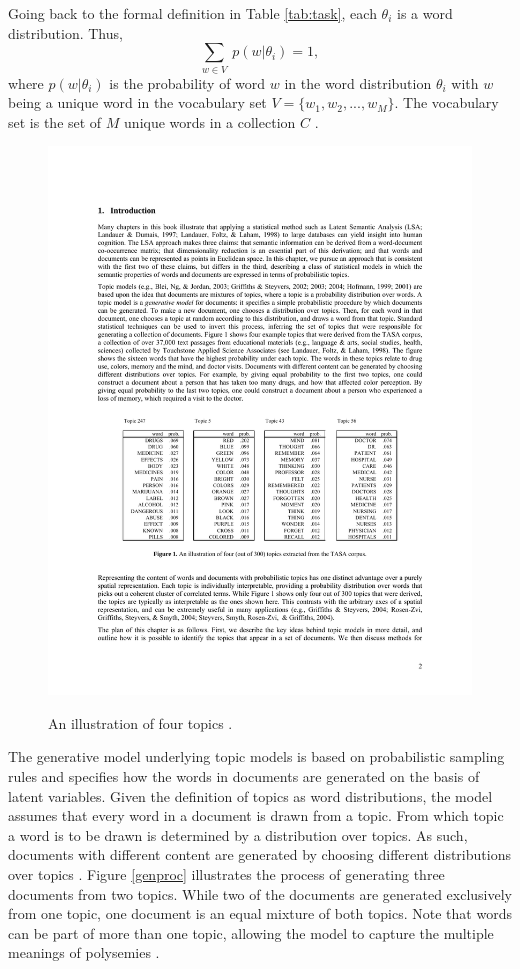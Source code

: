 \documentclass[11pt,a4paper,english,oneside]{book}
\numberwithin{equation}{chapter}
\begin{document}
Going back to the formal definition in Table \ref{tab:task}, each $\theta_i$ is a word distribution. Thus,
$$
\underset{w \in V}{\sum} \ p(w | \theta_i) = 1,
$$
where $p(w | \theta_i)$ is the probability of word $w$ in the word distribution $\theta_i$ with $w$ being a unique word in the vocabulary set $V = \{w_1, w_2, ..., w_M\}$. The vocabulary set is the set of $M$ unique words in a collection $C$ \cite[p.~338]{Zhai.2016}.

\begin{figure}
	\caption{An illustration of four topics \cite[p. 2]{Steyvers(2007)}.}
	\centering
	\includegraphics[scale=1]{Images/SteyversGriffithsTopics.pdf}
	\label{fourtopics}
\end{figure}

The generative model underlying topic models is based on probabilistic sampling rules and specifies how the words in documents are generated on the basis of latent variables. Given the definition of topics as word distributions, the model assumes that every word in a document is drawn from a topic. From which topic a word is to be drawn is determined by a distribution over topics. As such, documents with different content are generated by choosing different distributions over topics \cite[~pp. 2--3]{Steyvers(2007)}. Figure \ref{genproc} illustrates the process of generating three documents from two topics. While two of the documents are generated exclusively from one topic, one document is an equal mixture of both topics. Note that words can be part of more than one topic, allowing the model to capture the multiple meanings of polysemies \cite[~pp. 2--3]{Steyvers(2007)}.
\end{document}

